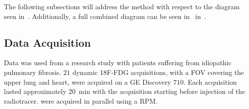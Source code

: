             The following subsections will address the method with respect to the diagram seen in~. Additionally, a full combined diagram can be seen in~ in~.
            
            \subsection{Data Acquisition} \label{sec:pca_data_driven_surrogate_signal_extraction_methods_for_dynamic_pet_methods_data_acquisition}
                Data was used from a research study with patients suffering from idiopathic pulmonary fibrosis. $21$ dynamic \gls{18F-FDG} acquisitions, with a \gls{FOV} covering the upper lung and heart, were acquired on a \gls{GE} Discovery $710$. Each acquisition lasted approximately \SI{20}{\minute} with the acquisition starting before injection of the radiotracer.  were acquired in parallel using a \gls{RPM}.
                
